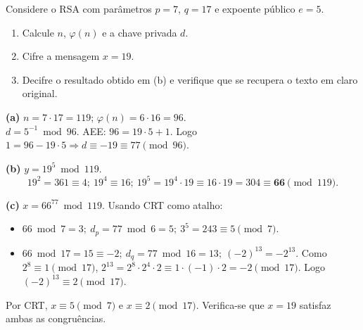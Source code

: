 \documentclass[12pt,a4paper]{article}
\begin{document}
\begin{exercicio}
Considere o RSA com par\^{a}metros $p = 7$, $q = 17$ e expoente p\'{u}blico $e = 5$.
\begin{enumerate}[label=(\alph*)]
    \item Calcule $n$, $\varphi(n)$ e a chave privada $d$.
    \item Cifre a mensagem $x = 19$.
    \item Decifre o resultado obtido em (b) e verifique que se recupera o texto em claro original.
\end{enumerate}

\begin{resposta}
\textbf{(a)} $n = 7 \cdot 17 = 119$; $\varphi(n) = 6 \cdot 16 = 96$. \\
$d = 5^{-1} \bmod 96$. AEE: $96 = 19 \cdot 5 + 1$. Logo $1 = 96 - 19 \cdot 5 \Rightarrow d \equiv -19 \equiv 77 \pmod{96}$.

\textbf{(b)} $y = 19^{5} \bmod 119$.
\[
19^{2} = 361 \equiv 4;\ 19^{4} \equiv 16;\ 19^{5} = 19^{4} \cdot 19 \equiv 16 \cdot 19 = 304 \equiv \mathbf{66} \pmod{119}.
\]

\textbf{(c)} $x = 66^{77} \bmod 119$. Usando CRT como atalho:
\begin{itemize}[leftmargin=1.4em,topsep=2pt,itemsep=1pt]
    \item $66 \bmod 7 = 3;\ d_p = 77 \bmod 6 = 5;\ 3^{5} = 243 \equiv 5 \pmod{7}.$
    \item $66 \bmod 17 = 15 \equiv -2;\ d_q = 77 \bmod 16 = 13;\ (-2)^{13} = -2^{13}.$ Como $2^{8} \equiv 1 \pmod{17}$, $2^{13} = 2^{8}\cdot 2^{4}\cdot 2 \equiv 1 \cdot (-1) \cdot 2 = -2 \pmod{17}.$ Logo $(-2)^{13} \equiv 2 \pmod{17}$.
\end{itemize}
Por CRT, $x \equiv 5 \pmod 7$ e $x \equiv 2 \pmod{17}$. Verifica-se que $x = 19$ satisfaz ambas as congru\^{e}ncias. \checkmark
\end{resposta}
\end{exercicio}
\end{document}
